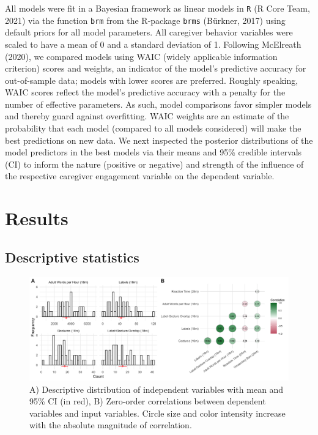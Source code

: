\documentclass[
  man,floatsintext]{apa6}
\begin{document}
All models were fit in a Bayesian framework as linear models in \texttt{R} (R Core Team, 2021) via the function \texttt{brm} from the R-package \texttt{brms} (Bürkner, 2017) using default priors for all model parameters. All caregiver behavior variables were scaled to have a mean of 0 and a standard deviation of 1. Following McElreath (2020), we compared models using WAIC (widely applicable information criterion) scores and weights, an indicator of the model's predictive accuracy for out-of-sample data; models with lower scores are preferred. Roughly speaking, WAIC scores reflect the model's predictive accuracy with a penalty for the number of effective parameters. As such, model comparisons favor simpler models and thereby guard against overfitting. WAIC weights are an estimate of the probability that each model (compared to all models considered) will make the best predictions on new data. We next inspected the posterior distributions of the model predictors in the best models via their means and 95\% credible intervals (CI) to inform the nature (positive or negative) and strength of the influence of the respective caregiver engagement variable on the dependent variable.

\hypertarget{results}{%
\section{Results}\label{results}}

\hypertarget{descriptive-statistics}{%
\subsection{Descriptive statistics}\label{descriptive-statistics}}

\begin{figure}
\includegraphics[width=1\linewidth]{../stats/figures/fig.1ab} \caption{A) Descriptive distribution of independent variables with mean and 95\% CI (in red), B) Zero-order correlations between dependent variables and input variables. Circle size and color intensity increase with the absolute magnitude of correlation.}\label{fig:fig2}
\end{figure}
\end{document}

